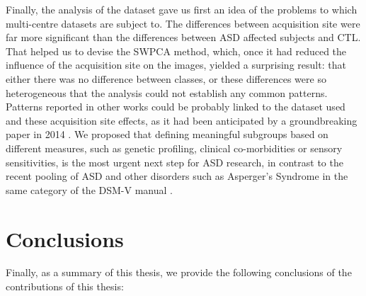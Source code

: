 Finally, the analysis of the \aimsmri{} dataset gave us first an idea of the problems to which multi-centre datasets are subject to. The differences between acquisition site were far more significant than the differences between \ac{ASD} affected subjects and \ac{CTL}. That helped us to devise the \ac{SWPCA} method, which, once it had reduced the influence of the acquisition site on the images, yielded a surprising result: that either there was no difference between classes, or these differences were so heterogeneous that the analysis could not establish any common patterns. Patterns reported in other works could be probably linked to the dataset used and these acquisition site effects, as it had been anticipated by a groundbreaking paper in 2014 \cite{haar2014anatomical}. We proposed that defining meaningful subgroups based on different measures, such as genetic profiling, clinical co-morbidities or sensory sensitivities, is the most urgent next step for \ac{ASD} research, in contrast to the recent pooling of \ac{ASD} and other disorders such as Asperger's Syndrome in the same category of the DSM-V manual \cite{Association2013}. 


\newpage
\section{Conclusions}
Finally, as a summary of this thesis, we provide the following conclusions of the contributions of this thesis: 

